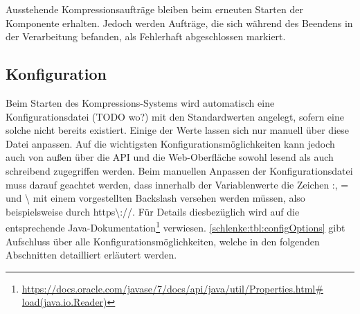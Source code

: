 Ausstehende Kompressionsaufträge bleiben beim erneuten Starten der Komponente erhalten. Jedoch werden Aufträge, die sich während des Beendens in der Verarbeitung befanden, als \glqq{}Fehlerhaft abgeschlossen\grqq{} markiert.

\subsection{Konfiguration}
\label{schlenke:chp:configuration}

Beim Starten des Kompressions-Systems wird automatisch eine Konfigurationsdatei (TODO wo?) mit den Standardwerten angelegt, sofern eine solche nicht bereits existiert. Einige der Werte lassen sich nur manuell über diese Datei anpassen. Auf die wichtigsten Konfigurationsmöglichkeiten kann jedoch auch von außen über die API und die Web-Oberfläche sowohl lesend als auch schreibend zugegriffen werden. Beim manuellen Anpassen der Konfigurationsdatei muss darauf geachtet werden, dass innerhalb der Variablenwerte die Zeichen \glqq{}:\grqq{}, \glqq{}=\grqq{} und \glqq{}\textbackslash\grqq{} mit einem vorgestellten Backslash versehen werden müssen, also beispielsweise durch \glqq{}https\textbackslash ://\grqq{}. Für Details diesbezüglich wird auf die entsprechende Java-Dokumentation\footnote{\url{https://docs.oracle.com/javase/7/docs/api/java/util/Properties.html\# load(java.io.Reader)}} verwiesen. \autoref{schlenke:tbl:configOptions} gibt Aufschluss über alle Konfigurationsmöglichkeiten, welche in den folgenden Abschnitten detailliert erläutert werden.

